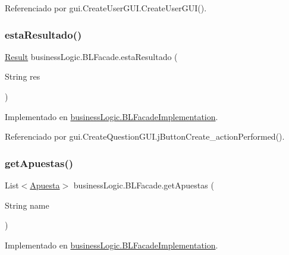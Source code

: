Referenciado por gui.\+Create\+User\+G\+U\+I.\+Create\+User\+G\+U\+I().

\mbox{\label{interfacebusinessLogic_1_1BLFacade_a3115bea528677d182ed5725eacbdf13c}} 
\subsubsection{\texorpdfstring{estaResultado()}{estaResultado()}}
{\footnotesize\ttfamily \mbox{\hyperlink{classdomain_1_1Result}{Result}} business\+Logic.\+B\+L\+Facade.\+esta\+Resultado (\begin{DoxyParamCaption}\item[{String}]{res }\end{DoxyParamCaption})}



Implementado en \mbox{\hyperlink{classbusinessLogic_1_1BLFacadeImplementation_ac0445d578f21530433001bfb7582a175}{business\+Logic.\+B\+L\+Facade\+Implementation}}.



Referenciado por gui.\+Create\+Question\+G\+U\+I.\+j\+Button\+Create\+\_\+action\+Performed().

\mbox{\label{interfacebusinessLogic_1_1BLFacade_ae1f0952366adb9a51b00889e7be9cf11}} 
\subsubsection{\texorpdfstring{getApuestas()}{getApuestas()}}
{\footnotesize\ttfamily List$<$\mbox{\hyperlink{classdomain_1_1Apuesta}{Apuesta}}$>$ business\+Logic.\+B\+L\+Facade.\+get\+Apuestas (\begin{DoxyParamCaption}\item[{String}]{name }\end{DoxyParamCaption})}



Implementado en \mbox{\hyperlink{classbusinessLogic_1_1BLFacadeImplementation_afbf2b534e813dc7344214b5b8d6ca4de}{business\+Logic.\+B\+L\+Facade\+Implementation}}.



